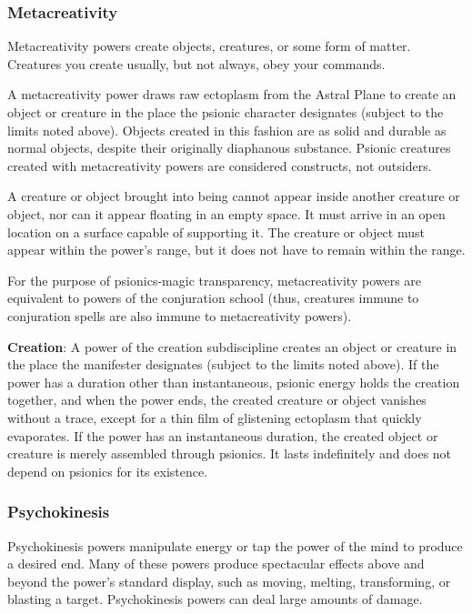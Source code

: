 \subsubsection{Metacreativity}
Metacreativity powers create objects, creatures, or some form of matter. Creatures you create usually, but not always, obey your commands.

A metacreativity power draws raw ectoplasm from the Astral Plane to create an object or creature in the place the psionic character designates (subject to the limits noted above). Objects created in this fashion are as solid and durable as normal objects, despite their originally diaphanous substance. Psionic creatures created with metacreativity powers are considered constructs, not outsiders.

A creature or object brought into being cannot appear inside another creature or object, nor can it appear floating in an empty space. It must arrive in an open location on a surface capable of supporting it. The creature or object must appear within the power's range, but it does not have to remain within the range.

For the purpose of psionics-magic transparency, metacreativity powers are equivalent to powers of the conjuration school (thus, creatures immune to conjuration spells are also immune to metacreativity powers).

\textbf{Creation}: A power of the creation subdiscipline creates an object or creature in the place the manifester designates (subject to the limits noted above). If the power has a duration other than instantaneous, psionic energy holds the creation together, and when the power ends, the created creature or object vanishes without a trace, except for a thin film of glistening ectoplasm that quickly evaporates. If the power has an instantaneous duration, the created object or creature is merely assembled through psionics. It lasts indefinitely and does not depend on psionics for its existence.

\subsubsection{Psychokinesis}
Psychokinesis powers manipulate energy or tap the power of the mind to produce a desired end. Many of these powers produce spectacular effects above and beyond the power's standard display, such as moving, melting, transforming, or blasting a target. Psychokinesis powers can deal large amounts of damage.


